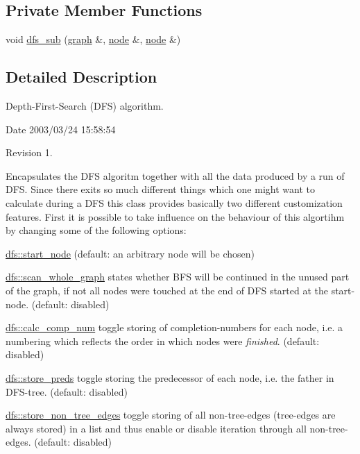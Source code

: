 \subsection*{Private Member Functions}
\begin{DoxyCompactItemize}
\item 
void \mbox{\hyperlink{classdfs_ad10b710339b289a61723aef52fbcb5b4}{dfs\+\_\+sub}} (\mbox{\hyperlink{classgraph}{graph}} \&, \mbox{\hyperlink{classnode}{node}} \&, \mbox{\hyperlink{classnode}{node}} \&)
\end{DoxyCompactItemize}


\subsection{Detailed Description}
Depth-\/\+First-\/\+Search (D\+FS) algorithm. 

\begin{DoxyParagraph}{Date}
2003/03/24 15\+:58\+:54 
\end{DoxyParagraph}
\begin{DoxyParagraph}{Revision}
1. 
\end{DoxyParagraph}


Encapsulates the D\+FS algoritm together with all the data produced by a run of D\+FS. Since there exits so much different things which one might want to calculate during a D\+FS this class provides basically two different customization features. First it is possible to take influence on the behaviour of this algortihm by changing some of the following options\+:
\begin{DoxyItemize}
\item \mbox{\hyperlink{classdfs_aad21fd0d3036350fd341f877d5747852}{dfs\+::start\+\_\+node}} (default\+: an arbitrary node will be chosen)
\item \mbox{\hyperlink{classdfs_aa7c864a6f3a120720138b187b3ed95b5}{dfs\+::scan\+\_\+whole\+\_\+graph}} states whether B\+FS will be continued in the unused part of the graph, if not all nodes were touched at the end of D\+FS started at the start-\/node. (default\+: disabled)
\item \mbox{\hyperlink{classdfs_a70862ea715c52eb95fb704afd3a6e676}{dfs\+::calc\+\_\+comp\+\_\+num}} toggle storing of completion-\/numbers for each node, i.\+e. a numbering which reflects the order in which nodes were {\itshape finished}. (default\+: disabled)
\item \mbox{\hyperlink{classdfs_a7043f46eb3887cbcbb1391fc783407a4}{dfs\+::store\+\_\+preds}} toggle storing the predecessor of each node, i.\+e. the father in D\+F\+S-\/tree. (default\+: disabled)
\item \mbox{\hyperlink{classdfs_a6f54f1c4339eacc8961e795439d4593d}{dfs\+::store\+\_\+non\+\_\+tree\+\_\+edges}} toggle storing of all non-\/tree-\/edges (tree-\/edges are always stored) in a list and thus enable or disable iteration through all non-\/tree-\/edges. (default\+: disabled)
\end{DoxyItemize}

